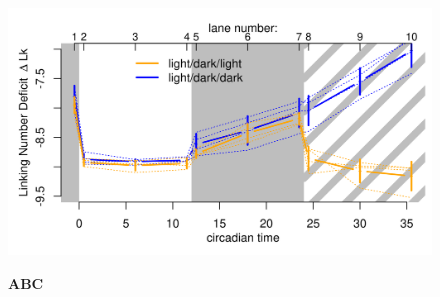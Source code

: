 \documentclass[10pt,letterpaper]{article}
\begin{document}
\begin{figure}
\begin{minipage}{.33\textwidth}
  \end{minipage}
  \begin{minipage}{.39\textwidth}
    \includegraphics[width=\textwidth]{figures/diurnal/linkingNumbers.png}
  \end{minipage}
   
  \vspace{-.75cm}
  \textbf{A}\hspace{.26\textwidth}\textbf{B}\hspace{.33\textwidth}\textbf{C}
  \vspace{.25cm}
  

\end{figure}
\end{document}
